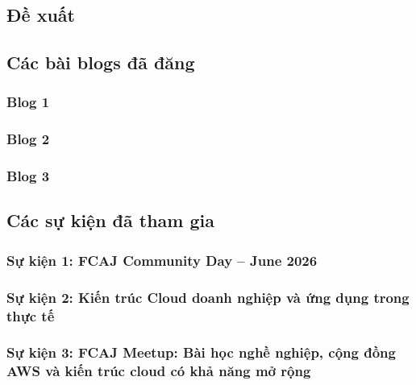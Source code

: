 \newpage

\subsection{Đề xuất}



\newpage

\subsection{Các bài blogs đã đăng}

\subsubsection{Blog 1}


\subsubsection{Blog 2}


\subsubsection{Blog 3}


\newpage

\subsection{Các sự kiện đã tham gia}

\subsubsection{Sự kiện 1: FCAJ Community Day – June 2026}


\subsubsection{Sự kiện 2: Kiến trúc Cloud doanh nghiệp và ứng dụng trong thực tế}


\subsubsection{Sự kiện 3: FCAJ Meetup: Bài học nghề nghiệp, cộng đồng AWS và kiến trúc cloud có khả năng mở rộng}


